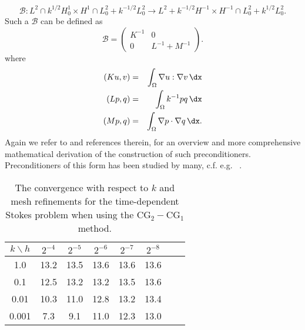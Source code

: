 \[
\mathcal{B}: L^2 \cap k^{1/2} H^1_0 \times H^1 \cap L_0^2 + k^{-1/2} L_0^2 \rightarrow 
L^2 + k^{-1/2} H^{-1} \times H^{-1} \cap L_0^2 + k^{1/2} L_0^2  .
\] 
Such a $\mathcal{B}$ can be defined as 
\[
\mathcal{B} 
= 
\begin{pmatrix} K^{-1} & 0 \\ 0 & L^{-1} + M^{-1} \end{pmatrix}.
\]
where 
\begin{eqnarray}
(K u, v) &=& \int_\Omega \nabla u: \nabla v \, \dx \\ 
(L p, q) &=& \int_\Omega k^{-1} p q \, \dx \\   
(M p, q) &=& \int_\Omega \nabla p \cdot  \nabla q \, \dx .   
\end{eqnarray}
Again we refer to \citep{MardalWinther11} and references therein,  for an overview and more comprehensive mathematical derivation 
of the construction of such preconditioners.  
Preconditioners of this form has been studied by many, c.f. e.g.
~\citep{CahouetChabard1988,ElmanSilvesterWathen2005,MardalWinther2004,MardalWinther11,Turek1999}. 

\begin{table}
\begin{center}
\begin{tabular}{|c|c||c|c|c|c|c|c|}
\hline
$k\backslash h$ & $2^{-4}$ & $2^{-5}$ & $2^{-6}$ & $2^{-7}$ & $2^{-8}$ \\ \hline\hline
1.0 & 13.2 & 13.5 & 13.6 & 13.6 & 13.6 \\ \hline 
0.1 & 12.5 & 13.2 & 13.2 & 13.5 & 13.6 \\ \hline 
0.01 & 10.3 & 11.0 & 12.8 & 13.2 & 13.4 \\ \hline 
0.001 & 7.3 & 9.1 & 11.0 & 12.3  & 13.0 \\ \hline 
\end{tabular}
\caption{The convergence with respect to $k$ and mesh refinements for the time-dependent Stokes problem 
when using the $\mathrm{CG}_2-\mathrm{CG}_1$ method.}\label{timestokes:ex} 
\end{center}
\end{table}

